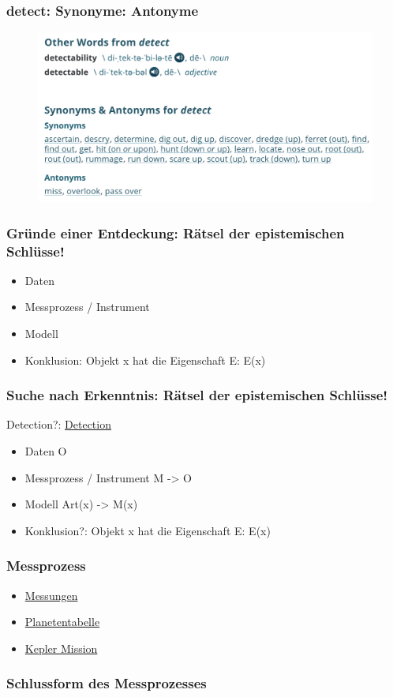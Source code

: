 \documentclass[11pt]{beamer}
\begin{document}
	\begin{frame}
	\frametitle{detect: Synonyme: Antonyme}
\begin{figure}
	\centering
	\includegraphics[width=0.7\linewidth]{screenshot002}
	\caption{}
	\label{fig:screenshot002}
\end{figure}
\end{frame}


	\begin{frame}
	\frametitle{Gründe einer Entdeckung: Rätsel der epistemischen Schlüsse!}
	\begin{itemize}
		\item Daten
		\item Messprozess / Instrument
		\item Modell
		\item Konklusion: Objekt x hat die Eigenschaft E: E(x) 
	\end{itemize}
\end{frame}

	\begin{frame}
	\frametitle{Suche nach Erkenntnis: Rätsel der epistemischen Schlüsse!}
	Detection?: \href{https://iopscience.iop.org/article/10.3847/2041-8213/ab0e8d}{Detection}
	\begin{itemize}
		\item Daten O
		\item Messprozess / Instrument M -> O	
		\item Modell Art(x) -> M(x)
		\item Konklusion?: Objekt x hat die Eigenschaft E: E(x) 
	\end{itemize}
\end{frame}


\begin{frame}
	\frametitle{Messprozess}
	
	\begin{itemize}
		\item\href{https://exoplanets.nasa.gov/5-ways-to-find-a-planet/}{Messungen}
		\item\href{https://exoplanetarchive.ipac.caltech.edu/cgi-bin/TblView/nph-tblView?app=ExoTbls&config=planets}{Planetentabelle}
		\item\href{https://www.nasa.gov/mission_pages/kepler/overview/index.html}{Kepler Mission}
	\end{itemize}
\end{frame}

\begin{frame}
	\frametitle{Schlussform des Messprozesses}
	
	\begin{itemize}
	\end{itemize}
\end{frame}
\end{document}
